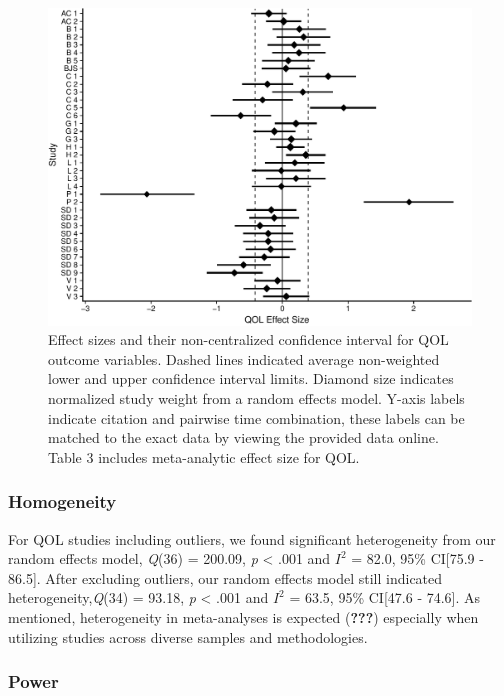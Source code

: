 \documentclass[man]{apa6}
\theoremstyle{definition}
\theoremstyle{definition}
\theoremstyle{definition}
\theoremstyle{remark}
\begin{document}
\begin{figure}[htbp]
\centering
\includegraphics{meta_markdown_files/figure-latex/qolpic-1.pdf}
\caption{\label{fig:qolpic}Effect sizes and their non-centralized confidence
interval for QOL outcome variables. Dashed lines indicated average
non-weighted lower and upper confidence interval limits. Diamond size
indicates normalized study weight from a random effects model. Y-axis
labels indicate citation and pairwise time combination, these labels can
be matched to the exact data by viewing the provided data online. Table
3 includes meta-analytic effect size for QOL.}
\end{figure}

\subsubsection{Homogeneity}\label{homogeneity-2}

For QOL studies including outliers, we found significant heterogeneity
from our random effects model, \emph{Q}(36) = 200.09, \emph{p}
\textless{} .001 and \(I^2\) = 82.0, 95\% CI{[}75.9 - 86.5{]}. After
excluding outliers, our random effects model still indicated
heterogeneity,\emph{Q}(34) = 93.18, \emph{p} \textless{} .001 and
\(I^2\) = 63.5, 95\% CI{[}47.6 - 74.6{]}. As mentioned, heterogeneity in
meta-analyses is expected ({\textbf{???}}) especially when utilizing
studies across diverse samples and methodologies.

\subsubsection{Power}\label{power-1}
\end{document}
